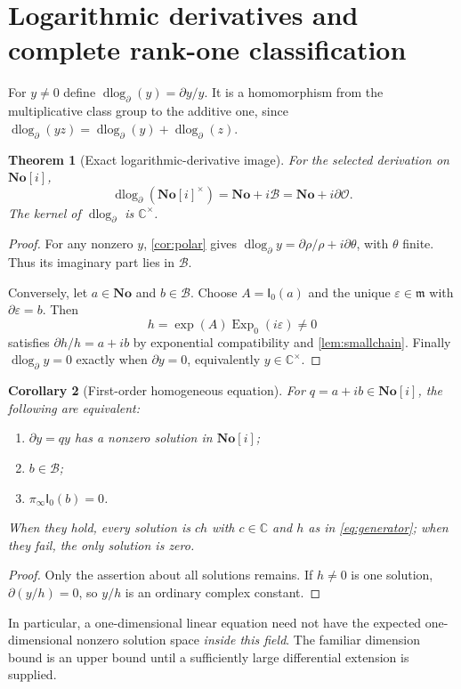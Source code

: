 \documentclass[11pt,a4paper]{article}
\newtheorem{theorem}{Theorem}[section]
\newtheorem{corollary}[theorem]{Corollary}
\theoremstyle{definition}
\newcommand{\No}{\mathbf{No}}
\newcommand{\SC}{\mathbf{No}[i]}
\newcommand{\C}{\mathbb C}
\newcommand{\D}{\partial}
\newcommand{\OO}{\mathcal O}
\newcommand{\mm}{\mathfrak m}
\newcommand{\BB}{\mathcal B}
\newcommand{\Expzero}{\operatorname{Exp}_0}
\newcommand{\dlog}{\operatorname{dlog}_{\D}}
\newcommand{\Ip}{\mathsf I_0}
\newcommand{\pinf}{\pi_{\infty}}
\numberwithin{equation}{section}
\begin{document}
\section{Logarithmic derivatives and complete rank-one classification}
\label{sec:logder}

For $y\ne0$ define $\dlog(y)=\D y/y$. It is a homomorphism from the
multiplicative class group to the additive one, since
$\dlog(yz)=\dlog(y)+\dlog(z)$.

\begin{theorem}[Exact logarithmic-derivative image]\label{thm:logimage}
For the selected derivation on $\SC$,
\begin{equation}\label{eq:mainimage}
 \boxed{\quad\dlog(\SC^\times)=\No+i\BB
             =\No+i\D\OO.\quad}
\end{equation}
The kernel of $\dlog$ is $\C^\times$.
\end{theorem}
\begin{proof}
For any nonzero $y$, \cref{cor:polar} gives
$\dlog y=\D\rho/\rho+i\D\theta$, with $\theta$ finite. Thus its
imaginary part lies in $\BB$.

Conversely, let $a\in\No$ and $b\in\BB$. Choose $A=\Ip(a)$ and the
unique $\varepsilon\in\mm$ with $\D\varepsilon=b$. Then
\begin{equation}\label{eq:generator}
 h=\exp(A)\Expzero(i\varepsilon)\ne0
\end{equation}
satisfies $\D h/h=a+ib$ by exponential compatibility and
\cref{lem:smallchain}. Finally $\dlog y=0$ exactly when
$\D y=0$, equivalently $y\in\C^\times$.
\end{proof}

\begin{corollary}[First-order homogeneous equation]\label{cor:rankone}
For $q=a+ib\in\SC$, the following are equivalent:
\begin{enumerate}[label=\textup{(\roman*)}]
\item $\D y=qy$ has a nonzero solution in $\SC$;
\item $b\in\BB$;
\item $\pinf\Ip(b)=0$.
\end{enumerate}
When they hold, every solution is $ch$ with $c\in\C$ and $h$ as in
\eqref{eq:generator}; when they fail, the only solution is zero.
\end{corollary}
\begin{proof}
Only the assertion about all solutions remains. If $h\ne0$ is one
solution, $\D(y/h)=0$, so $y/h$ is an ordinary complex constant.
\end{proof}
In particular, a one-dimensional linear equation need not have the
expected one-dimensional nonzero solution space \emph{inside this field}.
The familiar dimension bound is an upper bound until a sufficiently large
differential extension is supplied.
\end{document}
